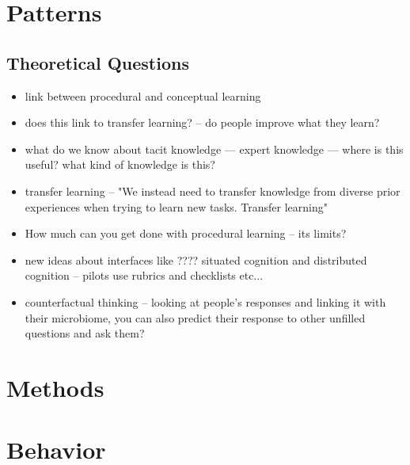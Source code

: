

\section{Patterns} 
\subsection{Theoretical Questions}
\begin{itemize}
\item link between procedural and conceptual learning
\item does this link to transfer learning? -- do people improve what they learn?
\item what do we know about tacit knowledge — expert knowledge  --- where is this useful? what kind of knowledge is this?
\item transfer learning --  "We instead need to transfer knowledge from diverse prior experiences when trying to learn new tasks. Transfer learning"
\item How much can you get done with procedural learning -- its limits?
\item new ideas about interfaces like ????
situated cognition and distributed cognition -- pilots use rubrics and checklists etc...
\item counterfactual thinking -- looking at people’s responses and linking it with their microbiome, you can also predict their response to other unfilled questions and ask them?
\end{itemize}

\section{Methods} 




\section{Behavior} 


